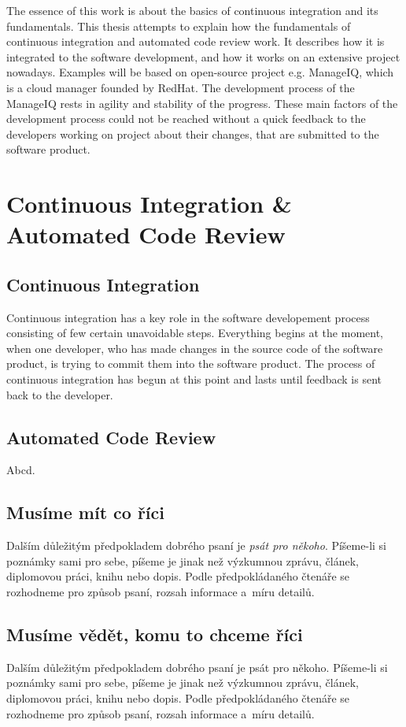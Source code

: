 The essence of this work is about the basics of continuous integration and its fundamentals. This thesis attempts to explain how the fundamentals of continuous integration and automated code review work. It describes how it is integrated to the software development, and how it works on an extensive project nowadays. Examples will be based on open-source project e.g. ManageIQ, which is a cloud manager founded by RedHat. The development process of the ManageIQ rests in agility and stability of the progress. These main factors of the development process could not be reached without a quick feedback to the developers working on project about their changes, that are submitted to the software product.\\

\chapter{Continuous Integration \& Automated Code Review}

\section{Continuous Integration}
Continuous integration has a key role in the software developement process consisting of few certain unavoidable steps. Everything begins at the moment, when one developer, who has made changes in the source code of the software product, is trying to commit them into the software product. The process of continuous integration has begun at this point and lasts until feedback is sent back to the developer.

\section{Automated Code Review}
Abcd.


\section{Musíme mít co říci}
Dalším důležitým předpokladem dobrého psaní je {\it psát pro někoho}. Píšeme-li si poznámky sami pro sebe, píšeme je jinak než výzkumnou zprávu, článek, diplomovou práci, knihu nebo dopis. Podle předpokládaného čtenáře se rozhodneme pro způsob psaní, rozsah informace a~míru detailů.

\section{Musíme vědět, komu to chceme říci}
Dalším důležitým předpokladem dobrého psaní je psát pro někoho. Píšeme-li si poznámky sami pro sebe, píšeme je jinak než výzkumnou zprávu, článek, diplomovou práci, knihu nebo dopis. Podle předpokládaného čtenáře se rozhodneme pro způsob psaní, rozsah informace a~míru detailů.


